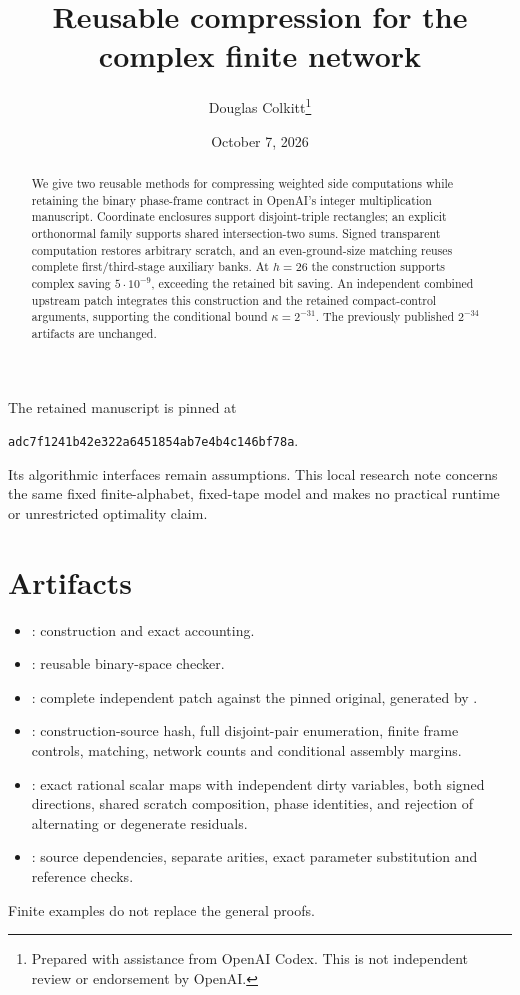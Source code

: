 \documentclass[11pt]{article}
\title{Reusable compression for the complex finite network}
\author{Douglas Colkitt\thanks{Prepared with assistance from OpenAI Codex.
This is not independent review or endorsement by OpenAI.}}
\date{October 7, 2026}
\begin{document}
\maketitle
\begin{abstract}
We give two reusable methods for compressing weighted side computations
while retaining the binary phase-frame contract in OpenAI's integer
multiplication manuscript. Coordinate enclosures support disjoint-triple
rectangles; an explicit orthonormal family supports shared intersection-two
sums. Signed transparent computation restores arbitrary scratch, and an
even-ground-size matching reuses complete first/third-stage auxiliary banks.
At $h=26$ the construction supports complex saving $5\cdot10^{-9}$,
exceeding the retained bit saving. An independent combined upstream patch
integrates this construction and the retained compact-control arguments,
supporting the conditional bound $\kappa=2^{-31}$. The previously published
$2^{-34}$ artifacts are unchanged.
\end{abstract}
The retained manuscript is pinned at
\begin{center}\texttt{adc7f1241b42e322a6451854ab7e4b4c146bf78a}.\end{center}
Its algorithmic interfaces remain assumptions. This local research note
concerns the same fixed finite-alphabet, fixed-tape model and makes no
practical runtime or unrestricted optimality claim.

\section{Artifacts}
\begin{itemize}
\item {}: construction and exact accounting.
\item {}: reusable binary-space checker.
\item {}: complete independent patch
against the pinned original, generated by
.
\item {}: construction-source hash,
full disjoint-pair enumeration, finite frame controls, matching, network counts
and conditional assembly margins.
\item {}: exact rational scalar maps
with independent dirty variables, both signed directions, shared scratch
composition, phase identities, and rejection of alternating or degenerate
residuals.
\item {}: source dependencies,
separate arities, exact parameter substitution and reference checks.
\end{itemize}
Finite examples do not replace the general proofs.
\end{document}
